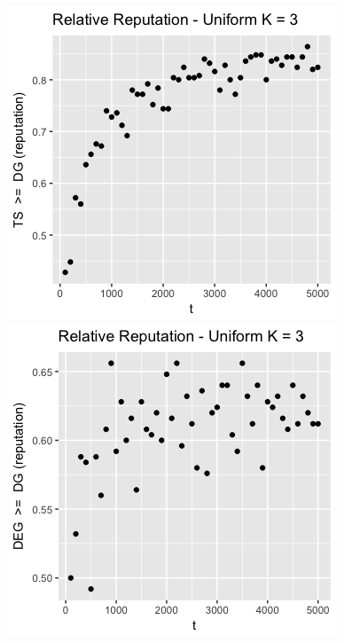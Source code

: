 \documentclass[11pt,letterpaper]{article}
\begin{document}
\includegraphics[scale=0.5]{ts_dg_unif_3_prelim} \\
\includegraphics[scale=0.5]{deg_dg_unif_3_prelim} \\
\end{document}
